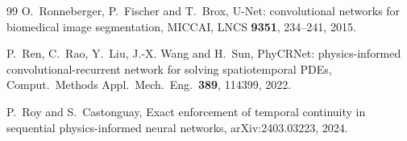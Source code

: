 \documentclass[11pt,a4paper]{article}
\begin{document}
\begin{thebibliography}{99}
O.~Ronneberger, P.~Fischer and T.~Brox, U-Net: convolutional networks for
biomedical image segmentation, MICCAI, LNCS \textbf{9351}, 234--241, 2015.

P.~Ren, C.~Rao, Y.~Liu, J.-X. Wang and H.~Sun, PhyCRNet: physics-informed
convolutional-recurrent network for solving spatiotemporal PDEs,
Comput.\ Methods Appl.\ Mech.\ Eng.\ \textbf{389}, 114399, 2022.

P.~Roy and S.~Castonguay, Exact enforcement of temporal continuity in
sequential physics-informed neural networks, arXiv:2403.03223, 2024.

\end{thebibliography}
\end{document}
